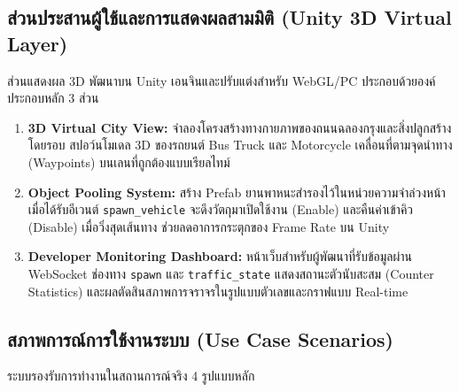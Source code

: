 \documentclass[12pt,a4paper]{report}
\begin{document}
\subsection{ส่วนประสานผู้ใช้และการแสดงผลสามมิติ (Unity 3D Virtual Layer)}
\label{subsec:unity}

ส่วนแสดงผล 3D พัฒนาบน Unity เอนจินและปรับแต่งสำหรับ WebGL/PC
ประกอบด้วยองค์ประกอบหลัก 3 ส่วน

\begin{enumerate}
  \item \textbf{3D Virtual City View:}
        จำลองโครงสร้างทางกายภาพของถนนฉลองกรุงและสิ่งปลูกสร้างโดยรอบ
        สปอว์นโมเดล 3D ของรถยนต์ Bus Truck และ Motorcycle
        เคลื่อนที่ตามจุดนำทาง (Waypoints) บนเลนที่ถูกต้องแบบเรียลไทม์

  \item \textbf{Object Pooling System:}
        สร้าง Prefab ยานพาหนะสำรองไว้ในหน่วยความจำล่วงหน้า
        เมื่อได้รับอีเวนต์ \texttt{spawn\_vehicle}
        จะดึงวัตถุมาเปิดใช้งาน (Enable)
        และคืนค่าเข้าคิว (Disable) เมื่อวิ่งสุดเส้นทาง
        ช่วยลดอาการกระตุกของ Frame Rate บน Unity

  \item \textbf{Developer Monitoring Dashboard:}
        หน้าเว็บสำหรับผู้พัฒนาที่รับข้อมูลผ่าน WebSocket ช่องทาง
        \texttt{spawn} และ \texttt{traffic\_state}
        แสดงสถานะตัวนับสะสม (Counter Statistics)
        และผลตัดสินสภาพการจราจรในรูปแบบตัวเลขและกราฟแบบ Real-time
\end{enumerate}

\subsection{สภาพการณ์การใช้งานระบบ (Use Case Scenarios)}
\label{subsec:scenarios}

ระบบรองรับการทำงานในสถานการณ์จริง 4 รูปแบบหลัก
\end{document}
